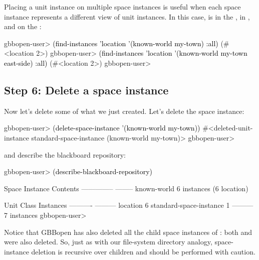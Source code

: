 \documentclass[10pt,twoside,english,pdftex]{article}
\begin{document}
Placing a unit instance on multiple space instances is useful when each space
instance represents a different view of unit instances.  In this case,
  is in the , in
, and on the :
%
\W\supp
\begin{example}
\textcolor{darkergray}{%
  gbbopen-user> \textcolor{black}{(find-instances 'location '(known-world my-town) :all)}
  (#<location 2>)
  gbbopen-user> \textcolor{black}{(find-instances 'location '(known-world my-town east-side) :all)}
  (#<location 2>)
  gbbopen-user>}
\end{example}

\subsection*{Step 6: Delete a space instance}

%
%
%
Now let's delete some of what we just created.  Let's delete the
 space instance:
%
\W\supp
\begin{example}
\textcolor{darkergray}{%
  gbbopen-user> \textcolor{black}{(delete-space-instance '(known-world my-town))}
  #<deleted-unit-instance standard-space-instance (known-world my-town)>
  gbbopen-user>}
\end{example}
%
%
and describe the blackboard repository:
%
\W\supp\notpretop
\begin{example}
\textcolor{darkergray}{%
  gbbopen-user> \textcolor{black}{(describe-blackboard-repository)}

  Space Instance                Contents
  --------------                --------
  known-world                   6 instances (6 location)

  Unit Class                    Instances
  ----------                    ---------
  location                              6
  standard-space-instance               1
                                ---------
                                        7 instances
  gbbopen-user>}
\end{example}
%
Notice that GBBopen has also deleted all the child space instances of
: both  and
 were also deleted.  So, just as with our file-system
directory analogy, space-instance deletion is recursive over children and
should be performed with caution.
\end{document}
